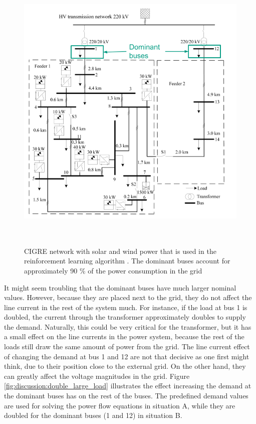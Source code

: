 \documentclass[class=book, crop=false, 11pt]{standalone}
\begin{document}
\begin{figure}[ht!]
    \center
    \includegraphics[height=14cm, width=13.5cm]{figures/cigre_network_dominant.png}
    \caption[size = 9]{CIGRE network with solar and wind power that is used in the reinforcement learning algorithm \cite{cigre}. The dominant buses account for approximately 90 \% of the power consumption in the grid}
    \label{fig:discussion:cigre_network_dominant}
\end{figure}
It might seem troubling that the dominant buses have much larger nominal values. However, because they are placed next to the grid, they do not affect the line current in the rest of the system much. For instance, if the load at bus 1 is doubled, the current through the transformer approximately doubles to supply the demand. Naturally, this could be very critical for the transformer, but it has a small effect on the line currents in the power system, because the rest of the loads still draw the same amount of power from the grid. The line current effect of changing the demand at bus 1 and 12 are not that decisive as one first might think, due to their position close to the external grid. On the other hand, they can greatly affect the voltage magnitudes in the grid. Figure \ref{fig:discussion:double_large_load} illustrates the effect increasing the demand at the dominant buses has on the rest of the buses. The predefined demand values are used for solving the power flow equations in situation A, while they are doubled for the dominant buses (1 and 12) in situation B.
\end{document}
